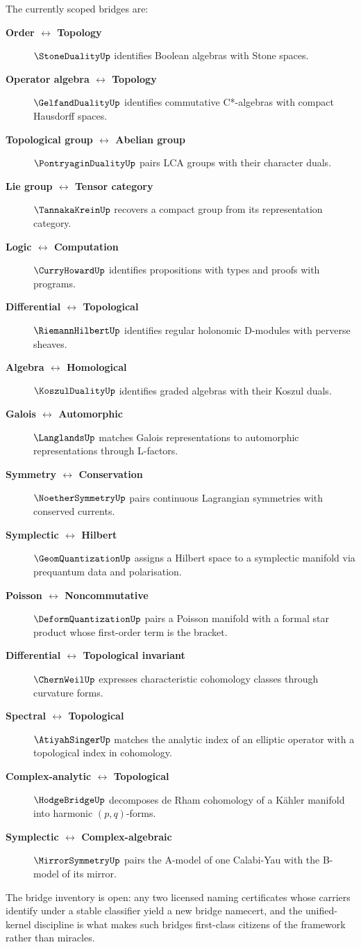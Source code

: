 The currently scoped bridges are:
\begin{description}
  \item[\textbf{Order $\leftrightarrow$ Topology}] $\StoneDualityUp$ identifies Boolean algebras with Stone spaces.
  \item[\textbf{Operator algebra $\leftrightarrow$ Topology}] $\GelfandDualityUp$ identifies commutative C*-algebras with compact Hausdorff spaces.
  \item[\textbf{Topological group $\leftrightarrow$ Abelian group}] $\PontryaginDualityUp$ pairs LCA groups with their character duals.
  \item[\textbf{Lie group $\leftrightarrow$ Tensor category}] $\TannakaKreinUp$ recovers a compact group from its representation category.
  \item[\textbf{Logic $\leftrightarrow$ Computation}] $\CurryHowardUp$ identifies propositions with types and proofs with programs.
  \item[\textbf{Differential $\leftrightarrow$ Topological}] $\RiemannHilbertUp$ identifies regular holonomic D-modules with perverse sheaves.
  \item[\textbf{Algebra $\leftrightarrow$ Homological}] $\KoszulDualityUp$ identifies graded algebras with their Koszul duals.
  \item[\textbf{Galois $\leftrightarrow$ Automorphic}] $\LanglandsUp$ matches Galois representations to automorphic representations through L-factors.
  \item[\textbf{Symmetry $\leftrightarrow$ Conservation}] $\NoetherSymmetryUp$ pairs continuous Lagrangian symmetries with conserved currents.
  \item[\textbf{Symplectic $\leftrightarrow$ Hilbert}] $\GeomQuantizationUp$ assigns a Hilbert space to a symplectic manifold via prequantum data and polarisation.
  \item[\textbf{Poisson $\leftrightarrow$ Noncommutative}] $\DeformQuantizationUp$ pairs a Poisson manifold with a formal star product whose first-order term is the bracket.
  \item[\textbf{Differential $\leftrightarrow$ Topological invariant}] $\ChernWeilUp$ expresses characteristic cohomology classes through curvature forms.
  \item[\textbf{Spectral $\leftrightarrow$ Topological}] $\AtiyahSingerUp$ matches the analytic index of an elliptic operator with a topological index in cohomology.
  \item[\textbf{Complex-analytic $\leftrightarrow$ Topological}] $\HodgeBridgeUp$ decomposes de Rham cohomology of a K\"{a}hler manifold into harmonic $(p,q)$-forms.
  \item[\textbf{Symplectic $\leftrightarrow$ Complex-algebraic}] $\MirrorSymmetryUp$ pairs the A-model of one Calabi-Yau with the B-model of its mirror.
\end{description}
The bridge inventory is open: any two licensed naming certificates whose carriers identify under a stable classifier yield a new bridge namecert, and the unified-kernel discipline is what makes such bridges first-class citizens of the framework rather than miracles.


